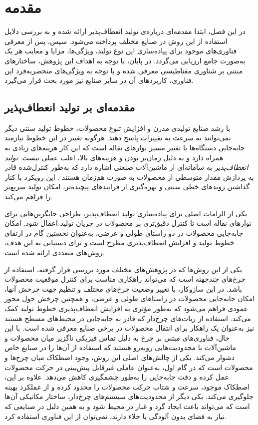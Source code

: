 
\chapter{مقدمه}
در این فصل، ابتدا مقدمه‌ای درباره‌ی تولید انعطاف‌پذیر ارائه شده و به بررسی دلایل استفاده از این روش در صنایع مختلف پرداخته می‌شود. سپس، پس از معرفی فناوری‌های موجود برای پیاده‌سازی این نوع تولید، ویژگی‌ها، مزایا و معایب هر یک به‌صورت جامع ارزیابی می‌گردد. در پایان، با توجه به اهداف این پژوهش، ساختارهای مبتنی بر شناوری مغناطیسی معرفی شده و با توجه به ویژگی‌های منحصربه‌فرد این فناوری، کاربردهای آن در سایر صنایع نیز مورد بحث قرار می‌گیرد.

\section{مقدمه‌ای بر تولید انعطاف‌پذیر}

با رشد صنایع تولیدی مدرن و افزایش تنوع محصولات، خطوط تولید سنتی دیگر نمی‌توانند به سرعت به تغییرات پاسخ دهند. هرگونه تغییر در این خطوط نیازمند جابه‌جایی دستگاه‌ها یا تغییر مسیر نوارهای نقاله است که این کار هزینه‌های زیادی به همراه دارد و به دلیل زمان‌بر بودن و هزینه‌های بالا، اغلب عملی نیست.
\textit{تولید انعطاف‌پذیر} 
به سامانه‌ای از ماشین‌آلات صنعتی اشاره دارد که به‌طور کنترل‌شده قادر به پردازش مقدار متوسطی از محصولات به صورت هم‌زمان هستند
\cite{browne1984classification}.
 این رویکرد با کنار گذاشتن روندهای خطی سنتی و بهره‌گیری از فرایندهای پیچیده‌تر، امکان تولید سریع‌تر را فراهم می‌کند.

یکی از الزامات اصلی برای پیاده‌سازی تولید انعطاف‌پذیر، طراحی جایگزین‌هایی برای نوارهای نقاله است تا کنترل دقیق‌تری بر محصولات در جریان تولید اعمال شود. امکان جابه‌جایی محصولات در دو راستای طولی و عرضی، به‌عنوان نخستین گام در ارتقای خطوط تولید و افزایش انعطاف‌پذیری مطرح است و برای دستیابی به این هدف، روش‌های متعددی ارائه شده است.

یکی از این روش‌ها که در پژوهش‌های مختلف مورد بررسی قرار گرفته، استفاده از چرخ‌های چندجهته است که می‌تواند راهکاری مناسب برای کنترل موقعیت محصولات باشد. در این سازوکار، با تغییر وضعیت چرخ‌های مختلف و تنظیم جهت چرخش آنها، امکان جابه‌جایی محصولات در راستاهای طولی و عرضی، و همچنین چرخش حول محور عمودی فراهم می‌شود که به‌طور مؤثری به افزایش انعطاف‌پذیری خطوط تولید کمک می‌کند. استفاده از ربات‌های چرخ‌دار که قادر به جابه‌جایی در محیط‌های مسطح هستند نیز به‌عنوان یک راهکار برای انتقال محصولات در برخی صنایع معرفی شده است. با این‌ حال، فناوری‌های مبتنی‌ بر چرخ به‌ دلیل تماس فیزیکی ناگزیر میان محصولات و ماشین‌آلات با محدودیت‌هایی روبه‌رو هستند که استفاده از آن‌ها را در صنایع خاص دشوار می‌کند. یکی از چالش‌های اصلی این روش، وجود اصطکاک میان چرخ‌ها و محصولات است که در گام اول، به‌عنوان عاملی غیرقابل‌ پیش‌بینی در حرکت محصولات عمل کرده و دقت جابه‌جایی را به‌طور چشمگیری کاهش می‌دهد. علاوه‌ بر این، اصطکاک موجود، سرعت و شتاب حرکت محصولات را محدود کرده و از عملکرد بهینه جلوگیری می‌کند.
یکی دیگر از محدودیت‌های سیستم‌های چرخ‌دار، ساختار مکانیکی آن‌ها است که می‌تواند باعث ایجاد گرد و غبار در محیط شود و به همین دلیل در صنایعی که نیاز به فضای بدون آلودگی یا خلاء دارند، نمی‌توان از این فناوری استفاده کرد.

